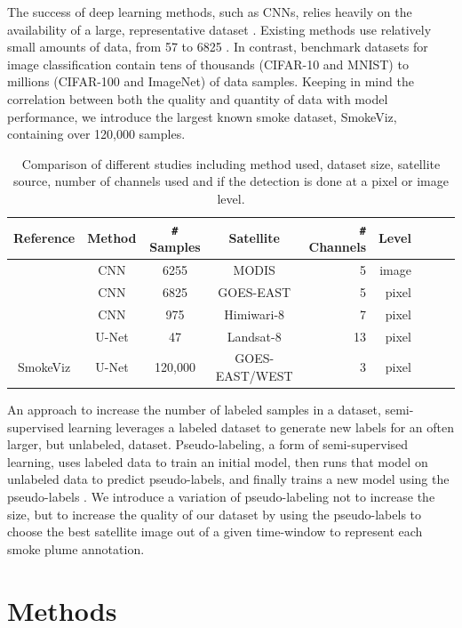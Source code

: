 \documentclass{article}
\begin{document}
The success of deep learning methods, such as CNNs, relies heavily on the availability of a large, representative dataset \cite{data_size}. Existing methods use relatively small amounts of data, from 57 \cite{wang} to 6825 \cite{smoke_goes}. In contrast, benchmark datasets for image classification contain tens of thousands (CIFAR-10 and MNIST) to millions (CIFAR-100 and ImageNet) of data samples. Keeping in mind the correlation between both the quality and quantity of data with model performance, we introduce the largest known smoke dataset, SmokeViz, containing over 120,000 samples.

\begin{table}[h]
    \caption{Comparison of different studies including method used, dataset size, satellite source, number of channels used and if the detection is done at a pixel or image level.}\label{studies}
    \centering
    \begin{tabular}{ccccrrcrc}
        \toprule
        Reference & Method & \verb|#| Samples & Satellite & \verb|#| Channels & Level\\
        \midrule
        \citep{smokenet}& CNN & 6255 & MODIS & 5 & image\\
        \citep{smoke_goes}& CNN & 6825 & GOES-EAST & 5 & pixel\\
        \citep{larsen} & CNN & 975 & Himiwari-8 & 7 & pixel\\
        \citep{wang}& U-Net & 47 & Landsat-8 & 13 & pixel\\
        SmokeViz  & U-Net & 120,000 & GOES-EAST/WEST & 3 & pixel\\
        \bottomrule
    \end{tabular}
\end{table}


An approach to increase the number of labeled samples in a dataset, semi-supervised learning leverages a labeled dataset to generate new labels for an often larger, but unlabeled, dataset. Pseudo-labeling, a form of semi-supervised learning, uses labeled data to train an initial model, then runs that model on unlabeled data to predict pseudo-labels, and finally trains a new model using the pseudo-labels \cite{pseudo}. We introduce a variation of pseudo-labeling not to increase the size, but to increase the quality of our dataset by using the pseudo-labels to choose the best satellite image out of a given time-window to represent each smoke plume annotation.


\section{Methods}
\end{document}
